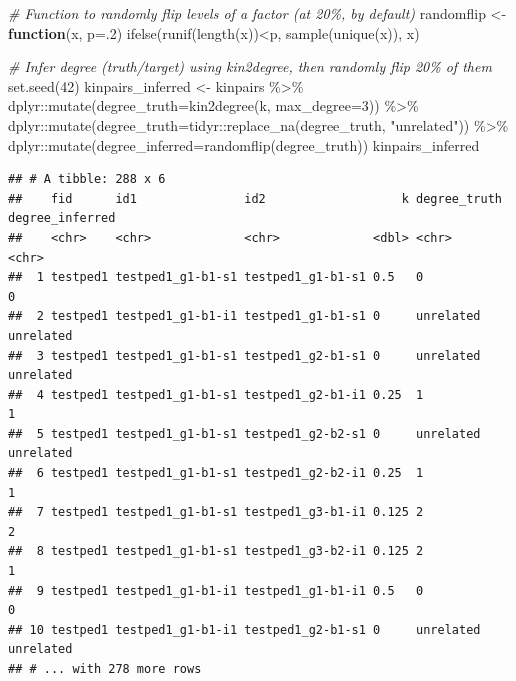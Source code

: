 \documentclass[9pt,a4paper,]{extarticle}
\newenvironment{Shaded}{\begin{snugshade}}{\end{snugshade}}
\newcommand{\AttributeTok}[1]{\textcolor[rgb]{0.77,0.63,0.00}{#1}}
\newcommand{\CommentTok}[1]{\textcolor[rgb]{0.56,0.35,0.01}{\textit{#1}}}
\newcommand{\ControlFlowTok}[1]{\textcolor[rgb]{0.13,0.29,0.53}{\textbf{#1}}}
\newcommand{\DecValTok}[1]{\textcolor[rgb]{0.00,0.00,0.81}{#1}}
\newcommand{\FunctionTok}[1]{\textcolor[rgb]{0.00,0.00,0.00}{#1}}
\newcommand{\NormalTok}[1]{#1}
\newcommand{\OtherTok}[1]{\textcolor[rgb]{0.56,0.35,0.01}{#1}}
\newcommand{\SpecialCharTok}[1]{\textcolor[rgb]{0.00,0.00,0.00}{#1}}
\newcommand{\StringTok}[1]{\textcolor[rgb]{0.31,0.60,0.02}{#1}}
\begin{document}
\begin{Shaded}
\begin{Highlighting}[]
\CommentTok{\# Function to randomly flip levels of a factor (at 20\%, by default)}
\NormalTok{randomflip }\OtherTok{\textless{}{-}} \ControlFlowTok{function}\NormalTok{(x, }\AttributeTok{p=}\NormalTok{.}\DecValTok{2}\NormalTok{) }\FunctionTok{ifelse}\NormalTok{(}\FunctionTok{runif}\NormalTok{(}\FunctionTok{length}\NormalTok{(x))}\SpecialCharTok{\textless{}}\NormalTok{p, }\FunctionTok{sample}\NormalTok{(}\FunctionTok{unique}\NormalTok{(x)), x)}

\CommentTok{\# Infer degree (truth/target) using kin2degree, then randomly flip 20\% of them}
\FunctionTok{set.seed}\NormalTok{(}\DecValTok{42}\NormalTok{)}
\NormalTok{kinpairs\_inferred }\OtherTok{\textless{}{-}}\NormalTok{ kinpairs }\SpecialCharTok{\%\textgreater{}\%} 
\NormalTok{  dplyr}\SpecialCharTok{::}\FunctionTok{mutate}\NormalTok{(}\AttributeTok{degree\_truth=}\FunctionTok{kin2degree}\NormalTok{(k, }\AttributeTok{max\_degree=}\DecValTok{3}\NormalTok{)) }\SpecialCharTok{\%\textgreater{}\%} 
\NormalTok{  dplyr}\SpecialCharTok{::}\FunctionTok{mutate}\NormalTok{(}\AttributeTok{degree\_truth=}\NormalTok{tidyr}\SpecialCharTok{::}\FunctionTok{replace\_na}\NormalTok{(degree\_truth, }\StringTok{"unrelated"}\NormalTok{)) }\SpecialCharTok{\%\textgreater{}\%} 
\NormalTok{  dplyr}\SpecialCharTok{::}\FunctionTok{mutate}\NormalTok{(}\AttributeTok{degree\_inferred=}\FunctionTok{randomflip}\NormalTok{(degree\_truth))}
\NormalTok{kinpairs\_inferred}
\end{Highlighting}
\end{Shaded}

\begin{verbatim}
## # A tibble: 288 x 6
##    fid      id1               id2                   k degree_truth degree_inferred
##    <chr>    <chr>             <chr>             <dbl> <chr>        <chr>          
##  1 testped1 testped1_g1-b1-s1 testped1_g1-b1-s1 0.5   0            0              
##  2 testped1 testped1_g1-b1-i1 testped1_g1-b1-s1 0     unrelated    unrelated      
##  3 testped1 testped1_g1-b1-s1 testped1_g2-b1-s1 0     unrelated    unrelated      
##  4 testped1 testped1_g1-b1-s1 testped1_g2-b1-i1 0.25  1            1              
##  5 testped1 testped1_g1-b1-s1 testped1_g2-b2-s1 0     unrelated    unrelated      
##  6 testped1 testped1_g1-b1-s1 testped1_g2-b2-i1 0.25  1            1              
##  7 testped1 testped1_g1-b1-s1 testped1_g3-b1-i1 0.125 2            2              
##  8 testped1 testped1_g1-b1-s1 testped1_g3-b2-i1 0.125 2            1              
##  9 testped1 testped1_g1-b1-i1 testped1_g1-b1-i1 0.5   0            0              
## 10 testped1 testped1_g1-b1-i1 testped1_g2-b1-s1 0     unrelated    unrelated      
## # ... with 278 more rows
\end{verbatim}
\end{document}
